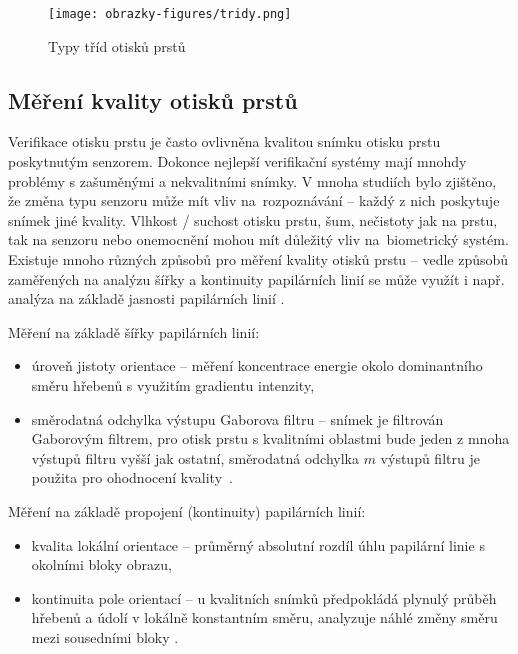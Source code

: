 \begin{figure}[!htbp]
    \centering
    \texttt{[image: obrazky-figures/tridy.png]}
    \caption{Typy tříd otisků prstů \cite{BIOopora}}
    \label{fig:tridy}
\end{figure}


\subsection{Měření kvality otisků prstů}
Verifikace otisku prstu je často ovlivněna kvalitou snímku otisku prstu poskytnutým senzorem. Dokonce nejlepší verifikační systémy mají mnohdy problémy s zašuměnými a nekvalitními snímky. V mnoha studiích bylo zjištěno, že změna typu senzoru může mít vliv na~rozpoznávání -- každý z nich poskytuje snímek jiné kvality. Vlhkost / suchost otisku prstu, šum, nečistoty jak na prstu, tak na senzoru nebo onemocnění mohou mít důležitý vliv na~biometrický systém. Existuje mnoho různých způsobů pro měření kvality otisků prstu -- vedle způsobů zaměřených na analýzu šířky a kontinuity papilárních linií se může využít i např. analýza na základě jasnosti papilárních linií \cite{FingerprintQuality}.

Měření na základě šířky papilárních linií:
\begin{itemize}
    \item úroveň jistoty orientace -- měření koncentrace energie okolo dominantního směru hřebenů s využitím gradientu intenzity,
    \item směrodatná odchylka výstupu Gaborova filtru -- snímek je filtrován Gaborovým filtrem, pro otisk prstu s kvalitními oblastmi bude jeden z mnoha výstupů filtru vyšší jak ostatní, směrodatná odchylka $m$ výstupů filtru je použita pro ohodnocení kvality~\cite{FingerprintQuality}.
\end{itemize}

Měření na základě propojení (kontinuity) papilárních linií:
\begin{itemize}
    \item kvalita lokální orientace -- průměrný absolutní rozdíl úhlu papilární linie s okolními bloky obrazu,
    \item kontinuita pole orientací -- u kvalitních snímků předpokládá plynulý průběh hřebenů a údolí v lokálně konstantním směru, analyzuje náhlé změny směru mezi sousedními bloky \cite{FingerprintQuality}.
\end{itemize}




